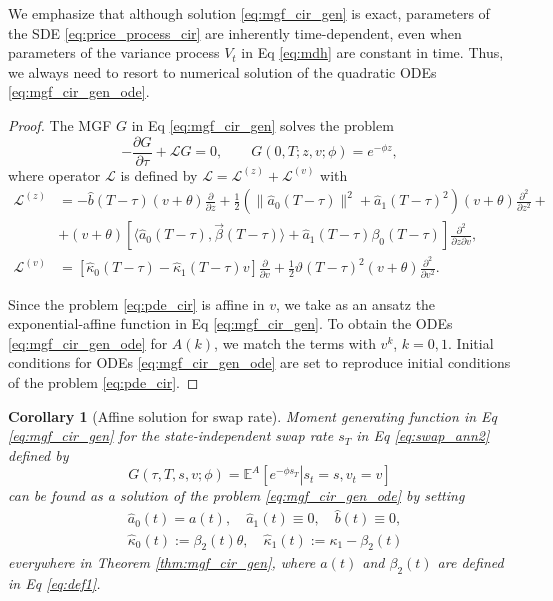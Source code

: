 \documentclass[pdftex,11pt,a4paper] {article}
\newtheorem{corollary}{Corollary}[section]
\begin{document}
We emphasize that although solution \eqref{eq:mgf_cir_gen} is exact, parameters of the SDE \eqref{eq:price_process_cir} are inherently time-dependent, even when parameters of the variance process $V_{t}$ in Eq \eqref{eq:mdh} are constant in time. Thus, we always need to resort to numerical solution of the  quadratic ODEs \eqref{eq:mgf_cir_gen_ode}. 

\begin{proof}
The MGF $G$ in Eq \eqref{eq:mgf_cir_gen} solves the problem
\begin{equation}\label{eq:pde_cir}
-\frac{\partial G}{\partial \tau}+\mathcal{L}G=0,\qquad G(0,T;z,v; \phi)=e^{-\phi z},
\end{equation}
where operator $\mathcal{L}$ is defined by $\mathcal{L}=\mathcal{L}^{(z)}+\mathcal{L}^{(v)}$ with
\begin{equation}\label{eq:pde_cir_generator}
\begin{split}
\mathcal{L}^{(z)}&=-\hat b(T-\tau)(v+\theta)\frac{\partial }{\partial z}+\frac{1}{2}\left(\|\hat a_0(T-\tau)\|^2+\hat a_1(T-\tau)^2\right)(v+\theta)\frac{\partial^2 }{\partial z^2}+\\
&+(v+\theta)\left[\langle \hat a_0(T-\tau), \vec\beta(T-\tau)\rangle +\hat a_1(T-\tau)\beta_0(T-\tau)\right]\frac{\partial^2 }{\partial z\partial v},\\
\mathcal{L}^{(v)}&=\left[\hat\kappa_0(T-\tau)-\hat\kappa_1(T-\tau) v\right]\frac{\partial }{\partial v}+\frac{1}{2}\vartheta(T-\tau)^2(v+\theta)\frac{\partial^2 }{\partial v^2}.
\end{split}
\end{equation}

Since the problem \eqref{eq:pde_cir} is affine in $v$, we take as an ansatz the exponential-affine function in Eq \eqref{eq:mgf_cir_gen}. To obtain the ODEs \eqref{eq:mgf_cir_gen_ode}  for
$A(k)$, we match the terms with $v^k$, $k=0,1$. Initial conditions
for ODEs \eqref{eq:mgf_cir_gen_ode} are set to reproduce initial conditions of the problem \eqref{eq:pde_cir}. 
\end{proof}



\begin{corollary}[Affine solution for swap rate] Moment generating function in Eq \eqref{eq:mgf_cir_gen} for the state-independent swap rate $s_T$ in Eq \eqref{eq:swap_ann2} defined by
\begin{equation}\label{eq:s_heston}
G(\tau,T,s,v;\phi)=\mathbb{E}^A\left[\left.e^{-\phi s_T}\right|s_t=s,v_t=v\right]
\end{equation}
can be found as a solution of the problem \eqref{eq:mgf_cir_gen_ode} by setting
\begin{equation*}
\begin{split}
&\hat a_0(t)=a(t),\quad \hat a_1(t)\equiv 0,\quad \hat b(t)\equiv 0,\\
&\hat\kappa_0(t):=\beta_2(t)\theta, \quad \hat\kappa_1(t):=\kappa_1-\beta_2(t)
\end{split}
\end{equation*}
everywhere in Theorem \ref{thm:mgf_cir_gen}, where $a(t)$ and $\beta_2(t)$ are defined in Eq \eqref{eq:def1}. 
\end{corollary}
\end{document}
